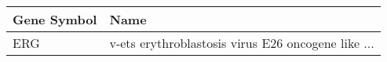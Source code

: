 \begin{tabular}{ll}
\toprule
Gene Symbol &                                               Name \\
\midrule
        ERG & v-ets erythroblastosis virus E26 oncogene like ... \\
\bottomrule
\end{tabular}
